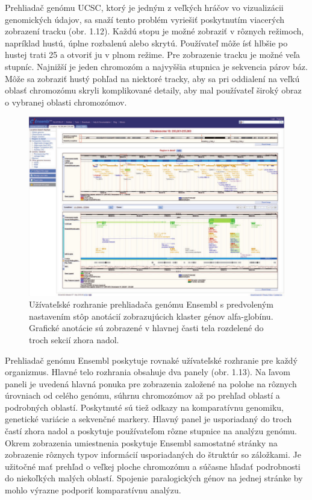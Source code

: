Prehliadač genómu UCSC, ktorý je jedným z veľkých hráčov vo vizualizácii genomických údajov, sa snaží tento problém vyriešiť poskytnutím viacerých zobrazení tracku (obr. 1.12).
Každú stopu je možné zobraziť v rôznych režimoch, napríklad hustú, úplne rozbalenú alebo skrytú.
Používateľ môže ísť hlbšie po hustej trati 25 a otvoriť ju v plnom režime.
Pre zobrazenie tracku je možné veľa stupníc.
Najnižší je jeden chromozóm a najvyššia stupnica je sekvencia párov báz.
Môže sa zobraziť hustý pohľad na niektoré tracky, aby sa pri oddialení na veľkú oblasť chromozómu skryli komplikované detaily, aby mal používateľ široký obraz o vybranej oblasti chromozómov.

\begin{figure}[!ht]
	\centering
	\includegraphics[width=.9\textwidth]{figures/ensembl_gb.png}
	\caption{Užívateľské rozhranie prehliadača genómu Ensembl s predvoleným nastavením stôp anotácií zobrazujúcich klaster génov alfa-globínu. Grafické anotácie sú zobrazené v hlavnej časti tela rozdelené do troch sekcií zhora nadol.\label{o:latex_friendly_zone}}
\end{figure}

Prehliadač genómu Ensembl poskytuje rovnaké užívateľské rozhranie pre každý organizmus.
Hlavné telo rozhrania obsahuje dva panely (obr. 1.13).
Na ľavom paneli je uvedená hlavná ponuka pre zobrazenia založené na polohe na rôznych úrovniach od celého genómu, súhrnu chromozómov až po prehľad oblastí a podrobných oblastí.
Poskytnuté sú tiež odkazy na komparatívnu genomiku, genetické variácie a sekvenčné markery.
Hlavný panel je usporiadaný do troch častí zhora nadol a poskytuje používateľom rôzne stupnice na analýzu genómu.
Okrem zobrazenia umiestnenia poskytuje Ensembl samostatné stránky na zobrazenie rôznych typov informácií usporiadaných do štruktúr so záložkami.
Je užitočné mať prehľad o veľkej ploche chromozómu a súčasne hľadať podrobnosti do niekoľkých malých oblastí.
Spojenie paralogických génov na jednej stránke by mohlo výrazne podporiť komparatívnu analýzu.

